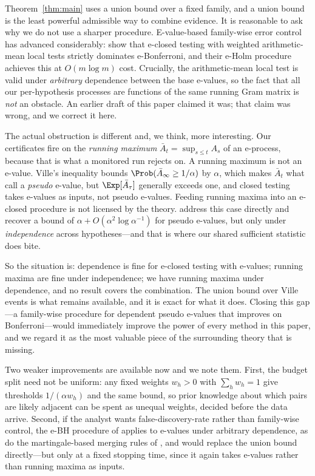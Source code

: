 Theorem~\ref{thm:main} uses a union bound over a fixed family, and a union
bound is the least powerful admissible way to combine evidence. It is
reasonable to ask why we do not use a sharper procedure. E-value-based
family-wise error control has advanced considerably: \citet{hartog2026fwer}
show that e-closed testing with weighted arithmetic-mean local tests strictly
dominates e-Bonferroni, and their e-Holm procedure achieves this at $O(m \log
m)$ cost. Crucially, the arithmetic-mean local test is valid under
\emph{arbitrary} dependence between the base e-values, so the fact that all
our per-hypothesis processes are functions of the same running Gram matrix is
\emph{not} an obstacle. An earlier draft of this paper claimed it was; that
claim was wrong, and we correct it here.

The actual obstruction is different and, we think, more interesting. Our
certificates fire on the \emph{running maximum} $\bar A_t = \sup_{s \le t}
A_s$ of an e-process, because that is what a monitored run rejects on. A
running maximum is not an e-value. Ville's inequality bounds
$\Prob(\bar A_\infty \ge 1/\alpha)$ by $\alpha$, which makes $\bar A_t$ what
\citet{hartog2026fwer} call a \emph{pseudo} e-value, but $\Exp[\bar A_\tau]$
generally exceeds one, and closed testing takes e-values as inputs, not
pseudo e-values. Feeding running maxima into an e-closed procedure is not
licensed by the theory. \citet{hartog2026fwer} address this case directly and
recover a bound of $\alpha + O(\alpha^2 \log \alpha^{-1})$ for pseudo
e-values, but only under \emph{independence} across hypotheses---and that is
where our shared sufficient statistic does bite.

So the situation is: dependence is fine for e-closed testing with e-values;
running maxima are fine under independence; we have running maxima under
dependence, and no result covers the combination. The union bound over Ville
events is what remains available, and it is exact for what it does. Closing
this gap---a family-wise procedure for dependent pseudo e-values that improves
on Bonferroni---would immediately improve the power of every method in this
paper, and we regard it as the most valuable piece of the surrounding theory
that is missing.

Two weaker improvements are available now and we note them. First, the budget
split need not be uniform: any fixed weights $w_h > 0$ with $\sum_h w_h = 1$
give thresholds $1/(\alpha w_h)$ and the same bound, so prior knowledge about
which pairs are likely adjacent can be spent as unequal weights, decided
before the data arrive. Second, if the analyst wants false-discovery-rate
rather than family-wise control, the e-BH procedure of
\citet{wang2022false} applies to e-values under arbitrary dependence, as do
the martingale-based merging rules of \citet{vovk2024merging}, and would
replace the union bound directly---but only at a fixed stopping time, since it
again takes e-values rather than running maxima as inputs.

